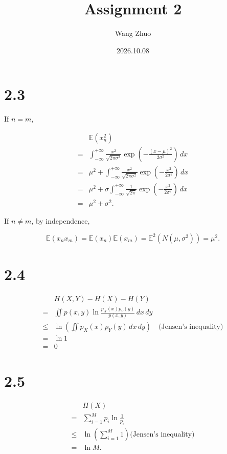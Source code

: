 \documentclass{article}
\title{Assignment 2}
\author{Wang Zhuo}
\date{2026.10.08}
\begin{document}
\maketitle

\section{2.3}

If $n=m$, 

\[
\begin{aligned}
    &\mathbb{E}(x^2_n)\\
    =&\int^{+\infty}_{-\infty}\frac{x^2}{\sqrt{2\pi\sigma^2}}\exp\left(-\frac{(x-\mu)^2}{2\sigma^2}\right)\,dx\\
    =&\mu^2+\int^{+\infty}_{-\infty}\frac{x^2}{\sqrt{2\pi\sigma^2}}\exp\left(-\frac{x^2}{2\sigma^2}\right)\,dx\\
    =&\mu^2+\sigma\int^{+\infty}_{-\infty}\frac{1}{\sqrt{2\pi}}\exp\left(-\frac{x^2}{2\sigma^2}\right)\,dx\\
    =&\mu^2+\sigma^2.
\end{aligned}
\]

If $n\neq m$, by independence,

\[
\mathbb{E}(x_n x_m)=\mathbb{E}(x_n)\mathbb{E}(x_m)=\mathbb{E}^2(N(\mu,\sigma^2))=\mu^2.
\]

\section{2.4}

\[
\begin{aligned}
    &H(X,Y)-H(X)-H(Y)\\
    =&\iint p(x,y)\ln\frac{p_X(x)p_Y(y)}{p(x,y)}\,dx\,dy\\
    \le& \ln(\iint p_X(x)p_Y(y)\,dx\,dy)\quad \text{(Jensen's inequality)}\\
    =&\ln1\\
    =& 0
\end{aligned}
\]

\section{2.5}

\[
\begin{aligned}
    &H(X)\\
    =&\sum^M_{i=1} p_i \ln\frac{1}{p_i}\\
    \leq& \ln (\sum^M_{i=1} 1) \text{(Jensen's inequality)}\\
    =&\ln M.
\end{aligned}
\]
\end{document}
